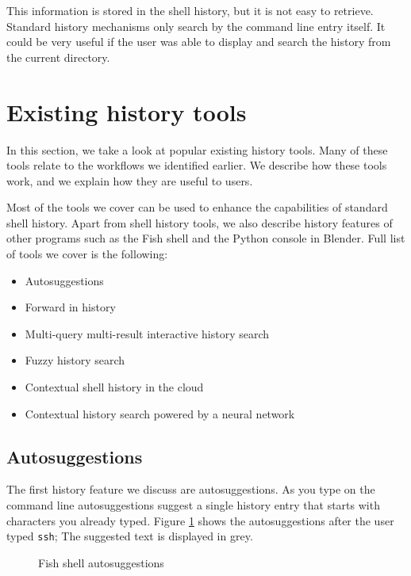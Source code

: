 This information is stored in the shell history, but it is not easy to retrieve. Standard history mechanisms only search by the command line entry itself. It could be very useful if the user was able to display and search the history from the current directory.

\section{Existing history tools}

In this section, we take a look at popular existing history tools. Many of these tools relate to the workflows we identified earlier. We describe how these tools work, and we explain how they are useful to users. 

Most of the tools we cover can be used to enhance the capabilities of standard shell history. Apart from shell history tools, we also describe history features of other programs such as the Fish shell\cite{fishdocs} and the Python console in Blender\cite{tools-blender-docs-python-console}. Full list of tools we cover is the following:

\begin{itemize}
    \item Autosuggestions
    \item Forward in history
    \item Multi-query multi-result interactive history search
    \item Fuzzy history search
    \item Contextual shell history in the cloud
    \item Contextual history search powered by a neural network
\end{itemize}

\subsection{Autosuggestions}

The first history feature we discuss are autosuggestions. As you type on the command line autosuggestions suggest a single history entry that starts with characters you already typed. Figure \ref{fish-autosuggestions} shows the autosuggestions after the user typed \verb|ssh|; The suggested text is displayed in grey.


\begin{figure}[h!]
  \caption{Fish shell autosuggestions}
  \label{fish-autosuggestions}
\end{figure}


